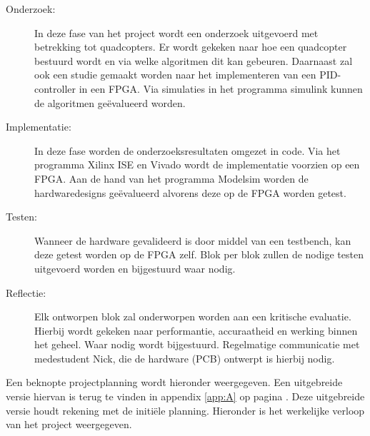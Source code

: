			\begin{description}
				
				\item[Onderzoek:] In deze fase van het project wordt een onderzoek uitgevoerd met betrekking tot quadcopters. Er wordt gekeken naar hoe een quadcopter bestuurd wordt en via welke algoritmen dit kan gebeuren. Daarnaast zal ook een studie gemaakt worden naar het implementeren van een PID-controller in een FPGA. Via simulaties in het programma simulink kunnen de algoritmen ge\"evalueerd worden.

				\item[Implementatie:] In deze fase worden de onderzoeksresultaten omgezet in code. Via het programma Xilinx ISE en Vivado wordt de implementatie voorzien op een FPGA. Aan de hand van het programma Modelsim worden de hardwaredesigns ge\"evalueerd alvorens deze op de FPGA worden getest.

				\item[Testen:] Wanneer de hardware gevalideerd is door middel van een testbench, kan deze getest worden op de FPGA zelf. Blok per blok zullen de nodige testen uitgevoerd worden en bijgestuurd waar nodig. 

				\item[Reflectie:] Elk ontworpen blok zal onderworpen worden aan een kritische evaluatie. Hierbij wordt gekeken naar performantie, accuraatheid en werking binnen het geheel. Waar nodig wordt bijgestuurd. Regelmatige communicatie met medestudent Nick, die de hardware (PCB) ontwerpt is hierbij nodig.

			\end{description}

		\par Een beknopte projectplanning wordt hieronder weergegeven. Een uitgebreide versie hiervan is terug te vinden in appendix \ref{app:A} op pagina \pageref{app:A}. Deze uitgebreide versie houdt rekening met de initi\"ele planning. Hieronder is het werkelijke verloop van het project weergegeven.

